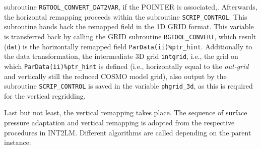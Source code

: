 \documentclass[11pt,twoside]{article}
\begin{document}
\begin{enumerate}
subroutine \verb|RGTOOL_CONVERT_DAT2VAR|, 
 if the {\footnotesize POINTER} is associated,.
Afterwards, the horizontal remapping proceeds within the subroutine 
\verb|SCRIP_CONTROL|. This subroutine hands back the remapped field in
the 1D GRID format. This variable is transferred back by calling the
GRID subroutine \verb|RGTOOL_CONVERT|, which result (\verb|dat|) is
the horizontally remapped field \verb|ParData(ii)%ptr_hint|.
Additionally to the data transformation, the intermediate
3D grid \verb|intgrid|, i.e., the grid on
which \verb|ParData(ii)%ptr_hint| is defined (i.e., horizontally equal
to the {\it out-grid} and vertically still the reduced COSMO model grid),
 also output by the subroutine \verb|SCRIP_CONTROL| is saved in the
variable \verb|phgrid_3d|, as this is required for the vertical regridding.
\end{enumerate}
Last but not least, the vertical remapping takes
 place. The sequence of surface pressure adaptation and vertical
 remapping is adopted from the respective procedures in INT2LM.
Different algorithms are called depending on the parent
 instance:
\end{document}

